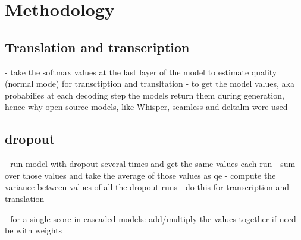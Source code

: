 
\chapter{Methodology}

\section{Translation and transcription}
- take the softmax values at the last layer of the model to estimate quality (normal mode) for transctiption and transltation 
- to get the model values, aka probabilies at each decoding step the models return them during generation, hence why open source models, like Whisper, seamless and deltalm were used
\section{dropout}
- run model with dropout several times and get the same values each run 
- sum over those values and take the average of those values as qe 
- compute the variance between values of all the dropout runs 
- do this for transcription and translation 


- for a single score in cascaded models: add/multiply the values together if need be with weights 

